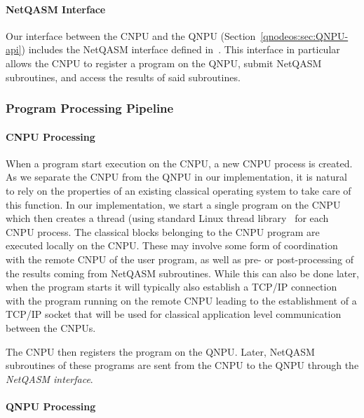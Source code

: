 \paragraph{NetQASM Interface}

Our interface between the \ac{CNPU} and the \ac{QNPU} (Section~\ref{qnodeos:sec:QNPU-api}) includes the \ac{NetQASM} interface 
defined in~\cite[Appendix A]{dahlberg_2022_netqasm}. This interface in particular allows the \ac{CNPU} to register a program on the \ac{QNPU}, submit \ac{NetQASM} subroutines, and access the results of said subroutines.

\subsubsection{Program Processing Pipeline}

\paragraph{CNPU Processing}

When a program start execution on the \ac{CNPU}, a new \ac{CNPU} process is created. As we separate the \ac{CNPU} from the \ac{QNPU} in our implementation, it is natural to rely on the properties of an existing classical operating system to take care of this function. In our implementation, we start a single program on the \ac{CNPU} which then creates a thread (using standard Linux thread library~\cite{linux_threads} for each \ac{CNPU} process. The classical blocks belonging to the \ac{CNPU} program are executed locally on the \ac{CNPU}. These may involve some form of coordination with the remote \ac{CNPU} of the user program, as well as pre- or post-processing of the results coming from \ac{NetQASM} subroutines. While this can also be done later, when the program starts it will typically also establish a TCP/IP connection with the program running on the remote \ac{CNPU} leading to the establishment of a TCP/IP socket that will be used for classical application level communication between the \acp{CNPU}.

The \ac{CNPU} then registers the program on the \ac{QNPU}. Later, \ac{NetQASM} subroutines of these programs are sent from the \ac{CNPU} to the \ac{QNPU} through the \emph{\ac{NetQASM} interface}. 

\paragraph{QNPU Processing}

